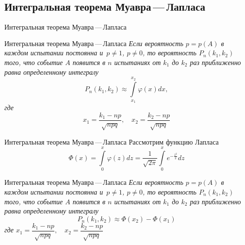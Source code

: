 \documentclass[unicode,11pt,notheorems,xcolor=table]{beamer}
\begin{document}
\subsection{Интегральная теорема Муавра\,---\,Лапласа}

\begin{frame}{Интегральная теорема Муавра\,---\,Лапласа}{}
   
    \begin{block}{Интегральная теорема Муавра\,---\,Лапласа}
        \itshape
        Если вероятность $p=p(A)$ в каждом испытании постоянна и~$p\neq 1$, $p \neq 0$, то вероятность $P_n(k_1,k_2)$ того, что событие $A$ появится в $n$ испытаниях  от $k_1$ до $k_2$ раз приближенно равна определенному интегралу
        $$
            P_n(k_1,k_2) \approx \int\limits_{x_1}^{x_2}\varphi(x)dx, 
        $$
        где
        $$  
            x_1 = \frac{k_1-np}{\sqrt{npq}},\quad x_2 = \frac{k_2-np}{\sqrt{npq}}
        $$  

    \end{block}
\end{frame}
\begin{frame}{Интегральная теорема Муавра\,---\,Лапласа}{}
    Рассмотрим функцию Лапласа
    $$
        \Phi(x) = \int\limits_0^x \varphi(z)dz = \frac{1}{\sqrt{2\pi}}\int\limits_0^x e^{-\frac{z^2}{2}}dz
    $$
    \begin{block}{Интегральная теорема Муавра\,---\,Лапласа}
        \itshape
        Если вероятность $p=p(A)$ в каждом испытании постоянна и~$p\neq 1$, $p \neq 0$, то вероятность $P_n(k_1,k_2)$ того, что событие $A$ появится в $n$ испытаниях  от $k_1$ до $k_2$ раз приближенно равна определенному интегралу
        $$
            P_n(k_1,k_2) \approx \Phi(x_2)-\Phi(x_1)
        $$
        где
        $x_1 = \dfrac{k_1-np}{\sqrt{npq}},\quad x_2 = \dfrac{k_2-np}{\sqrt{npq}}$  

    \end{block}
\end{frame}
\end{document}
